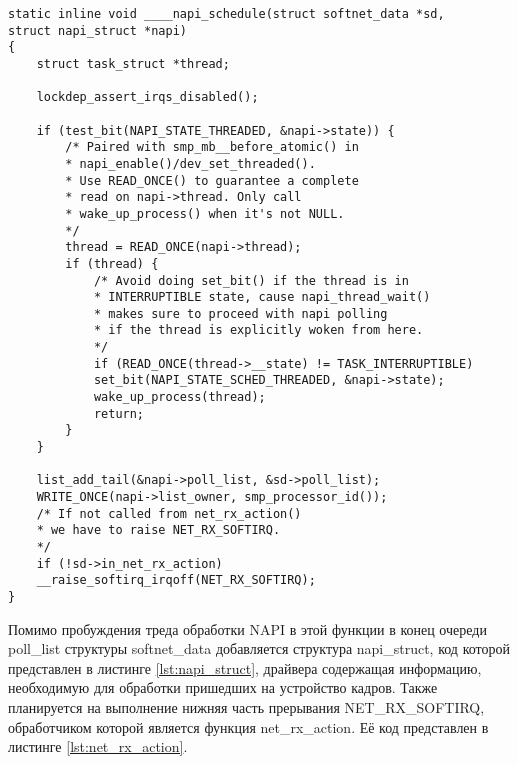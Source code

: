 \begin{center}
	\captionsetup{justification=raggedright,singlelinecheck=off}
	\begin{lstlisting}[label=lst:napi_schedule,caption=Функция \_\_\_\_napi\_schedule,showstringspaces=false]
static inline void ____napi_schedule(struct softnet_data *sd,
struct napi_struct *napi)
{
	struct task_struct *thread;
	
	lockdep_assert_irqs_disabled();
	
	if (test_bit(NAPI_STATE_THREADED, &napi->state)) {
		/* Paired with smp_mb__before_atomic() in
		* napi_enable()/dev_set_threaded().
		* Use READ_ONCE() to guarantee a complete
		* read on napi->thread. Only call
		* wake_up_process() when it's not NULL.
		*/
		thread = READ_ONCE(napi->thread);
		if (thread) {
			/* Avoid doing set_bit() if the thread is in
			* INTERRUPTIBLE state, cause napi_thread_wait()
			* makes sure to proceed with napi polling
			* if the thread is explicitly woken from here.
			*/
			if (READ_ONCE(thread->__state) != TASK_INTERRUPTIBLE)
			set_bit(NAPI_STATE_SCHED_THREADED, &napi->state);
			wake_up_process(thread);
			return;
		}
	}
	
	list_add_tail(&napi->poll_list, &sd->poll_list);
	WRITE_ONCE(napi->list_owner, smp_processor_id());
	/* If not called from net_rx_action()
	* we have to raise NET_RX_SOFTIRQ.
	*/
	if (!sd->in_net_rx_action)
	__raise_softirq_irqoff(NET_RX_SOFTIRQ);
}

	\end{lstlisting}
\end{center}
\FloatBarrier

Помимо пробуждения треда обработки NAPI в этой функции в конец очереди poll\_list структуры  softnet\_data добавляется структура  napi\_struct, код которой представлен в листинге \ref{lst:napi_struct}, драйвера содержащая информацию, необходимую для обработки пришедших на устройство кадров. Также планируется на выполнение нижняя часть прерывания NET\_RX\_SOFTIRQ, обработчиком  которой является функция net\_rx\_action. Её код представлен в листинге \ref{lst:net_rx_action}.


